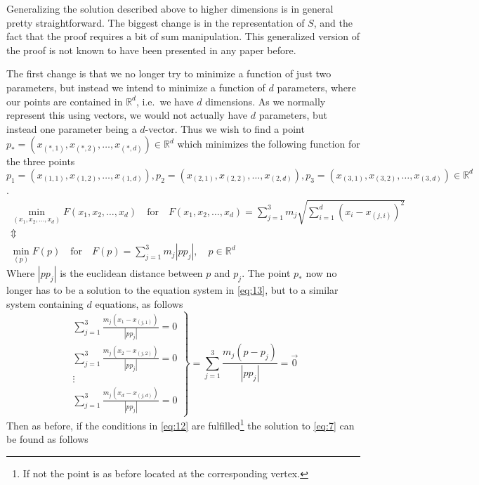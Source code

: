 Generalizing the solution described above to higher dimensions is in general
pretty straightforward. The biggest change is in the representation of $S$, and
the fact that the proof requires a bit of sum manipulation. This generalized
version of the proof is not known to have been presented in any paper before.

The first change is that we no longer try to minimize a function of just two
parameters, but instead we intend to minimize a function of $d$ parameters,
where our points are contained in $\mathbb{R}^d$, i.e.\ we have $d$ dimensions. As we
normally represent this using vectors, we would not actually have $d$
parameters, but instead one parameter being a $d$-vector. Thus we wish to find a
point $p_\ast = (x_{(\ast,1)}, x_{(\ast,2)}, \ldots, x_{(\ast,d)}) \in \mathbb{R}^d$
which minimizes the following function for the three points
$p_1 = (x_{(1,1)}, x_{(1,2)}, \ldots, x_{(1,d)}), p_2 = (x_{(2,1)}, x_{(2,2)},
\ldots, x_{(2,d)}), p_3 = (x_{(3,1)}, x_{(3,2)}, \ldots, x_{(3,d)}) \in \mathbb{R}^d$.
%
\begin{gather}
  \min_{(x_1, x_2, \ldots, x_d)} F(x_1, x_2, \ldots, x_d) \quad \text{for} \quad
  F(x_1, x_2, \ldots, x_d) = \sum_{j=1}^3 m_j \sqrt{\sum_{i=1}^d {(x_i -
    x_{(j,i)})}^2 }
  \\ \Updownarrow \\
  \label{eq:4}
  \min_{(p)} F(p) \quad \text{for} \quad
  F(p) = \sum_{j=1}^3 m_j | p p_j |, \quad p \in \mathbb{R}^d
\end{gather}
%
Where $|p p_j|$ is the euclidean distance between $p$ and $p_j$. The point
$p_\ast$ now no longer has to be a solution to the equation system in
\cref{eq:13}, but to a similar system containing $d$ equations, as follows
%
\begin{equation}
\label{eq:7}
  \left.
    \begin{array}{c}
    \sum_{j=1}^3 \frac{m_j(x_1-x_{(j,1)})}{| p p_j|} = 0
    \\
    \sum_{j=1}^3 \frac{m_j(x_2-x_{(j,2)})}{| p p_j|} = 0
    \\
    \vdots
    \\
    \sum_{j=1}^3 \frac{m_j(x_d-x_{(j,d)})}{| p p_j|} = 0
  \end{array}
  \right\} =
  \sum_{j=1}^3 \frac{m_j (p - p_j)}{| p p_j |} = \vec 0
\end{equation}
%
Then as before, if the conditions in \cref{eq:12} are fulfilled\footnote{If not
  the point is as before located at the corresponding vertex.} the solution to
\cref{eq:7} can be found as follows
